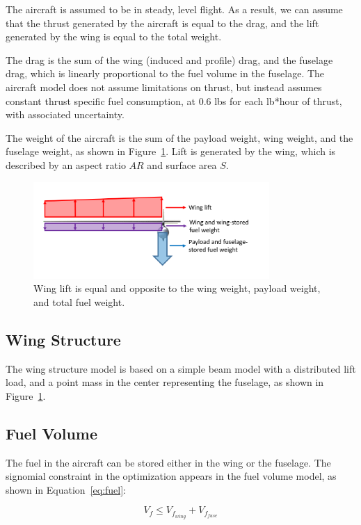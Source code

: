 \documentclass{article}
\begin{document}
The aircraft is assumed to be in steady, level flight. As a result, we can assume that the thrust generated by the aircraft is equal to the drag, and the lift generated by the wing is equal to the total weight.

The drag is the sum of the wing (induced and profile) drag, and the fuselage drag, which is linearly proportional to the fuel volume in the fuselage. The aircraft model does not assume limitations on thrust, but instead assumes constant thrust specific fuel consumption, at 0.6 lbs for each lb*hour of thrust, with associated uncertainty. 

The weight of the aircraft is the sum of the payload weight, wing weight, and the fuselage weight, as shown in Figure~\ref{fig:liftweight}. Lift is generated by the wing, which is described by an aspect ratio $AR$ and surface area $S$. 

\begin{figure}
\centering
\caption{\label{fig:liftweight} Wing lift is equal and opposite to the wing weight, payload weight, and total fuel weight.}
\includegraphics[width=0.8\textwidth]{liftweight.png}
\end{figure}

\subsection{Wing Structure}
The wing structure model is based on a simple beam model with a distributed lift load, and a point mass in the center representing the fuselage, as shown in Figure~\ref{fig:liftweight}.

\subsection{Fuel Volume}
The fuel in the aircraft can be stored either in the wing or the fuselage. The signomial constraint in the optimization appears in the fuel volume model, as shown in Equation~\ref{eq:fuel}:

\begin{equation}
\label{eq:fuel}
V_f \leq V_{f_{wing}} + V_{f_{fuse}} 
\end{equation}
\end{document}
